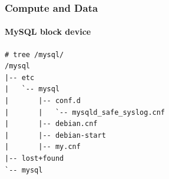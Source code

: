\begin{frame}[fragile]
\frametitle{Compute and Data}
\framesubtitle{MySQL block device}
\begin{lstlisting}
# tree /mysql/
/mysql
|-- etc
|   `-- mysql
|       |-- conf.d
|       |   `-- mysqld_safe_syslog.cnf
|       |-- debian.cnf
|       |-- debian-start
|       |-- my.cnf
|-- lost+found
`-- mysql
\end{lstlisting}
\end{frame}

